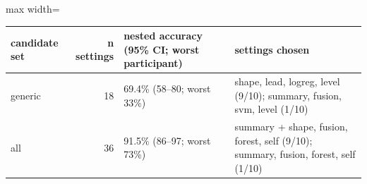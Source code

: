 \begin{adjustbox}{max width=\textwidth}
{\footnotesize
\begin{tabular}{lrp{3.6cm}p{6.6cm}}
\toprule
\textbf{candidate set} & \textbf{n settings} & \textbf{nested accuracy (95\% CI; worst participant)} & \textbf{settings chosen} \\
\midrule
generic & 18 & 69.4\% (58--80; worst 33\%) & shape, lead, logreg, level (9/10); summary, fusion, svm, level (1/10) \\
all & 36 & 91.5\% (86--97; worst 73\%) & summary + shape, fusion, forest, self (9/10); summary, fusion, forest, self (1/10) \\
\bottomrule
\end{tabular}
}
\end{adjustbox}
